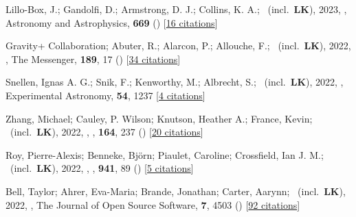 \item[{\color{numcolor}\scriptsize78}] Lillo-Box, J.; Gandolfi, D.; Armstrong, D. J.; Collins, K. A.; \etal\ (incl.\ \textbf{LK}), 2023, , Astronomy and Astrophysics, \textbf{669} () [\href{https://ui.adsabs.harvard.edu/abs/2023A&A...669A.109L}{16 citations}]

\item[{\color{numcolor}\scriptsize77}] Gravity+ Collaboration; Abuter, R.; Alarcon, P.; Allouche, F.; \etal\ (incl.\ \textbf{LK}), 2022, , The Messenger, \textbf{189}, 17 () [\href{https://ui.adsabs.harvard.edu/abs/2022Msngr.189...17A}{34 citations}]

\item[{\color{numcolor}\scriptsize76}] Snellen, Ignas A. G.; Snik, F.; Kenworthy, M.; Albrecht, S.; \etal\ (incl.\ \textbf{LK}), 2022, , Experimental Astronomy, \textbf{54}, 1237 [\href{https://ui.adsabs.harvard.edu/abs/2022ExA....54.1237S}{4 citations}]

\item[{\color{numcolor}\scriptsize75}] Zhang, Michael; Cauley, P. Wilson; Knutson, Heather A.; France, Kevin; \etal\ (incl.\ \textbf{LK}), 2022, , \aj, \textbf{164}, 237 () [\href{https://ui.adsabs.harvard.edu/abs/2022AJ....164..237Z}{20 citations}]

\item[{\color{numcolor}\scriptsize74}] Roy, Pierre-Alexis; Benneke, Bj{\"o}rn; Piaulet, Caroline; Crossfield, Ian J. M.; \etal\ (incl.\ \textbf{LK}), 2022, , \apj, \textbf{941}, 89 () [\href{https://ui.adsabs.harvard.edu/abs/2022ApJ...941...89R}{5 citations}]

\item[{\color{numcolor}\scriptsize73}] Bell, Taylor; Ahrer, Eva-Maria; Brande, Jonathan; Carter, Aarynn; \etal\ (incl.\ \textbf{LK}), 2022, , The Journal of Open Source Software, \textbf{7}, 4503 () [\href{https://ui.adsabs.harvard.edu/abs/2022JOSS....7.4503B}{92 citations}]

